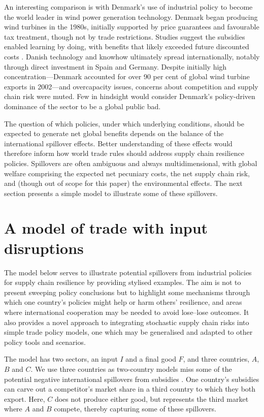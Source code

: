\documentclass{article}
\begin{document}
An interesting comparison is with Denmark's use of industrial policy to become the world leader in wind power generation technology. Denmark began producing wind turbines in the 1980s, initially supported by price guarantees and favourable tax treatment, though not by trade restrictions. Studies suggest the subsidies enabled learning by doing, with benefits that likely exceeded future discounted costs \parencite{hansen_establishment_2003}. Danish technology and knowhow ultimately spread internationally, notably through direct investment in Spain and Germany. Despite initially high concentration---Denmark accounted for over 90 per cent of global wind turbine exports in 2002---and overcapacity issues, concerns about competition and supply chain risk were muted. Few in hindsight would consider Denmark's policy-driven dominance of the sector to be a global public bad.

The question of which policies, under which underlying conditions, should be expected to generate net global benefits depends on the balance of the international spillover effects. Better understanding of these effects would therefore inform how world trade rules should address supply chain resilience policies. Spillovers are often ambiguous and always multidimensional, with global welfare comprising the expected net pecuniary costs, the net supply chain risk, and (though out of scope for this paper) the environmental effects. The next section presents a simple model to illustrate some of these spillovers.

\section{A model of trade with input disruptions}

The model below serves to illustrate potential spillovers from industrial policies for supply chain resilience by providing stylised examples. The aim is not to present sweeping policy conclusions but to highlight some mechanisms through which one country's policies might help or harm others' resilience, and areas where international cooperation may be needed to avoid lose--lose outcomes. It also provides a novel approach to integrating stochastic supply chain risks into simple trade policy models, one which may be generalised and adapted to other policy tools and scenarios.

The model has two sectors, an input $I$ and a final good $F$, and three countries, $A$, $B$ and $C$. We use three countries as two-country models miss some of the potential negative international spillovers from subsidies \parencite{bown_wtoing_2019}. One country's subsidies can carve out a competitor's market share in a third country to which they both export. Here, $C$ does not produce either good, but represents the third market where $A$ and $B$ compete, thereby capturing some of these spillovers. 
\end{document}
